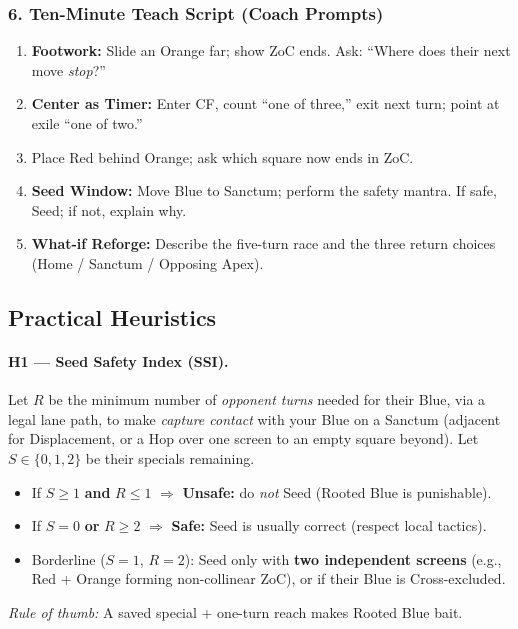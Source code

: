 \documentclass[11pt]{article}
\begin{document}
\subsubsection*{6. Ten-Minute Teach Script (Coach Prompts)}
\begin{enumerate}\itemsep0.25em
  \item \textbf{Footwork:} Slide an Orange far; show ZoC ends. Ask: “Where does their next move \emph{stop}?”
  \item \textbf{Center as Timer:} Enter CF, count “one of three,” exit next turn; point at exile “one of two.”
  \item {} Place Red behind Orange; ask which square now ends in ZoC.
  \item \textbf{Seed Window:} Move Blue to Sanctum; perform the safety mantra. If safe, Seed; if not, explain why.
  \item \textbf{What-if Reforge:} Describe the five-turn race and the three return choices (Home / Sanctum / Opposing Apex).
\end{enumerate}

\subsection*{Practical Heuristics}
\paragraph{H1 — Seed Safety Index (SSI).}
Let $R$ be the minimum number of \emph{opponent turns} needed for their Blue, via a legal lane path, to make \emph{capture contact} with your Blue on a Sanctum (adjacent for Displacement, or a Hop over one screen to an empty square beyond). Let $S\in\{0,1,2\}$ be their specials remaining.
\begin{itemize}
  \item If $S\ge 1$ \textbf{and} $R\le 1$ $\Rightarrow$ \textbf{Unsafe:} do \emph{not} Seed (Rooted Blue is punishable).
  \item If $S=0$ \textbf{or} $R\ge 2$ $\Rightarrow$ \textbf{Safe:} Seed is usually correct (respect local tactics).
  \item Borderline ($S=1$, $R=2$): Seed only with \textbf{two independent screens} (e.g., Red + Orange forming non-collinear ZoC), or if their Blue is Cross-excluded.
\end{itemize}
\emph{Rule of thumb:} A saved special + one-turn reach makes Rooted Blue bait.
\end{document}
